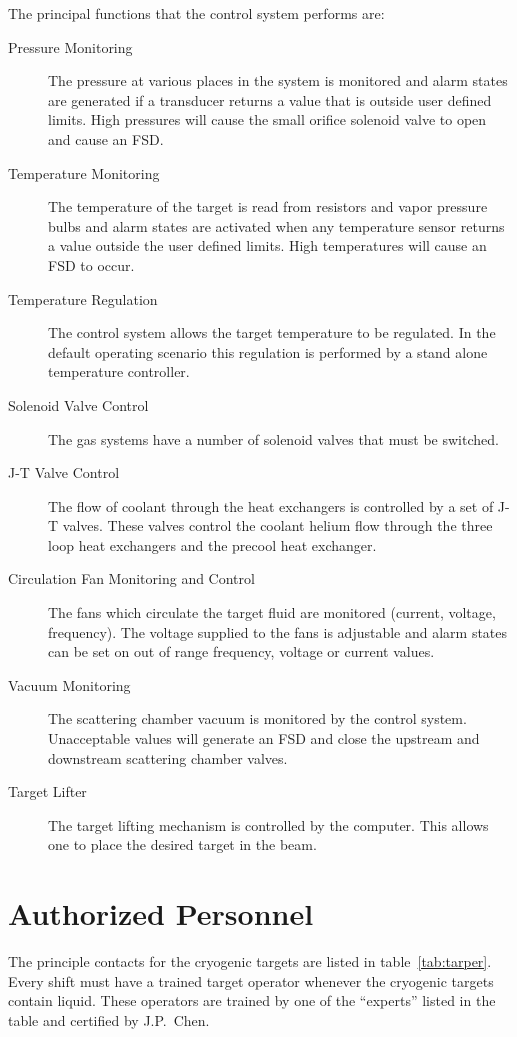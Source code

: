 {The principal functions that the control system performs are:
\begin{description}
\item[Pressure Monitoring] The pressure at various places in the system is
monitored and alarm states are generated if a transducer returns a value
that is outside user defined limits. High pressures will cause the
small orifice solenoid valve to open and cause an FSD.
\item[Temperature Monitoring] The temperature of the target
is read from resistors and vapor pressure bulbs and alarm states are
activated when any temperature sensor returns a value outside
the user defined limits. High temperatures will cause an FSD to occur.
\item[Temperature Regulation] The control system allows the target
temperature to be regulated. In the default operating scenario this regulation
is performed by a stand alone temperature controller.
\item[Solenoid Valve Control] The gas systems have a number of solenoid valves
that must be switched.
\item[J-T Valve Control] The flow of coolant through the heat exchangers
is controlled by a set of J-T valves. These valves control the coolant 
helium flow through the three loop heat exchangers and the precool heat
exchanger.
\item[Circulation Fan Monitoring and Control] The fans which circulate
the target fluid are monitored (current, voltage, frequency). The
voltage supplied to the fans is adjustable and alarm states can be set
on out of range frequency, voltage or current values.
\item[Vacuum Monitoring] The scattering chamber vacuum is monitored by
the control system. Unacceptable values will generate an FSD and close
the upstream and downstream  scattering chamber valves.
\item[Target Lifter] The target lifting mechanism is controlled by
the computer. This allows one to place the desired target in the beam.
\end{description}

\section{ Authorized Personnel}

The principle contacts for the cryogenic targets are listed in 
table~\ref{tab:tarper}. Every shift must have a trained target
operator whenever the cryogenic targets contain liquid. These
operators are trained by one of the ``experts'' listed in the
table and certified by J.P.~Chen.

}
